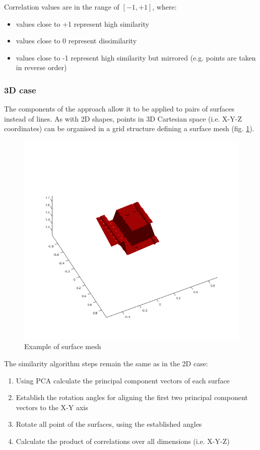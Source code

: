 \documentclass[
    floatsintext
]{article}
\begin{document}
Correlation values are in the range of $[-1,+1]$, where:
\begin{itemize}
    \item values close to +1 represent high similarity
    \item values close to 0 represent dissimilarity 
    \item values close to -1 represent high similarity but mirrored (e.g. points are taken in reverse order) 
\end{itemize}

\pagebreak[2]
\subsubsection{3D case}

The components of the approach allow it to be applied to pairs of surfaces instead of lines. 
As with 2D shapes, points in 3D Cartesian space (i.e. X-Y-Z coordinates) can be organised in a grid structure defining a surface mesh (fig. \ref{fig:mesh_example}).

\begin{figure}[h]
  \centering
  \includegraphics[width=.5\textwidth]{./figures/mesh_example.png}
  \caption{Example of surface mesh}
  \label{fig:mesh_example}
\end{figure}  

The similarity algorithm steps remain the same as in the 2D case: 
\begin{enumerate}
    \item Using PCA calculate the principal component vectors of each surface 
    \item Establish the rotation angles for aligning the first two principal component vectors to the X-Y axis 
    \item Rotate all point of the surfaces, using the established angles
    \item Calculate the product of correlations over all dimensions (i.e. X-Y-Z) 
\end{enumerate}
\end{document}
